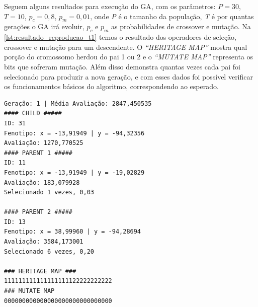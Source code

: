 Seguem alguns resultados para execução do GA, com os parâmetros: \(P = 30\), \(T = 10\), \(p_c = 0,8\), \(p_m = 0,01\), onde \textit{P} é o tamanho da população, \textit{T} é por quantas gerações o GA irá evoluir, \(p_c\) e \(p_m\) as probabilidades de crossover e mutação. Na \autoref{lst:resultado_reproducao_t1} temos o resultado dos operadores de seleção, crossover e mutação para um descendente. O \textit{``HERITAGE MAP''} mostra qual porção do cromossomo herdou do pai 1 ou 2 e o \textit{``MUTATE MAP''} representa os bits que sofreram mutação. Além disso demonstra quantas vezes cada pai foi selecionado para produzir a nova geração, e com esses dados foi possível verificar os funcionamentos básicos do algoritmo, correspondendo ao esperado. %

%
%

\begin{lstlisting}[caption = {Resultado de um ciclo de seleção, crossover e mutação do teste preliminar}, label=lst:resultado_reproducao_t1]
Geração: 1 | Média Avaliação: 2847,450535
#### CHILD #####
ID: 31
Fenotipo: x = -13,91949 | y = -94,32356
Avaliação: 1270,770525
#### PARENT 1 #####
ID: 11
Fenotipo: x = -13,91949 | y = -19,02829
Avaliação: 183,079928
Selecionado 1 vezes, 0,03

#### PARENT 2 #####
ID: 13
Fenotipo: x = 38,99960 | y = -94,28694
Avaliação: 3584,173001
Selecionado 6 vezes, 0,20

### HERITAGE MAP ###
111111111111111111122222222222
### MUTATE MAP
000000000000000000000000000000
\end{lstlisting}

